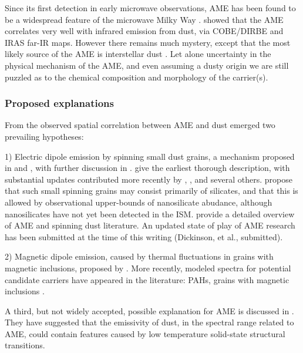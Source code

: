      Since its first detection in early microwave observations, AME has been found to be a widespread feature of the microwave Milky Way \citep{dickinson13r}. \cite{kogut96,deoliveiracosta97,leitch98} showed that the AME correlates very well with infrared emission from dust, via COBE/DIRBE and IRAS far-IR maps. However there remains much mystery, except that the most likely source of the AME is interstellar dust \citep{ysard10a,tibbs11,hensley16}. Let alone uncertainty in the physical mechanism of the AME, and even assuming a dusty origin\- we are still puzzled as to the chemical composition and morphology of the carrier(s).



  \subsubsection{Proposed explanations}

     From the observed spatial correlation between AME and dust emerged two prevailing hypotheses:

    1) Electric dipole emission by spinning small dust grains, a mechanism proposed in \cite{erickson57} and \cite{hoyle70}, with further discussion in \cite{ferrara94}. \cite{draine98b} give the earliest thorough description, with substantial updates contributed more recently by \cite{ysard10a}, \cite{ali-haimoud09}, \cite{hoang10} and several others. \cite{hensley17a} propose that such small spinning grains may consist primarily of silicates, and that this is allowed by observational upper-bounds of nanosilicate abudance, although nanosilicates have not yet been detected in the ISM. \cite{dickinson13r} provide a detailed overview of AME and spinning dust literature. An updated state of play of AME research has been submitted at the time of this writing (Dickinson, et al., submitted).

    2) Magnetic dipole emission, caused by thermal fluctuations in grains with magnetic inclusions, proposed by \cite{draine99}.
     More recently, modeled spectra for potential candidate carriers have appeared in the literature: PAHs, grains with magnetic inclusions \citep{draine13, ali-haimoud14, hoang16a}.

    A third, but not widely accepted, possible explanation for AME is discussed in \cite{jones09}. They have suggested that the emissivity of dust, in the spectral range related to AME, could contain features caused by low temperature solid-state structural transitions.

